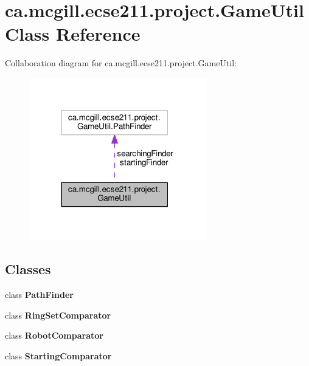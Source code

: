 \hypertarget{classca_1_1mcgill_1_1ecse211_1_1project_1_1_game_util}{}\section{ca.\+mcgill.\+ecse211.\+project.\+Game\+Util Class Reference}
\label{classca_1_1mcgill_1_1ecse211_1_1project_1_1_game_util}


Collaboration diagram for ca.\+mcgill.\+ecse211.\+project.\+Game\+Util\+:\nopagebreak
\begin{figure}[H]
\begin{center}
\leavevmode
\includegraphics[width=219pt]{classca_1_1mcgill_1_1ecse211_1_1project_1_1_game_util__coll__graph}
\end{center}
\end{figure}
\subsection*{Classes}
\begin{DoxyCompactItemize}
\item 
class {\bfseries Path\+Finder}
\item 
class {\bfseries Ring\+Set\+Comparator}
\item 
class {\bfseries Robot\+Comparator}
\item 
class {\bfseries Starting\+Comparator}
\end{DoxyCompactItemize}
